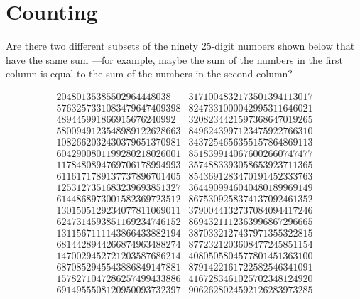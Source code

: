 \chapter{Counting}


\label{why_count_sec}

Are there two different subsets of the ninety 25-digit numbers shown below
that have the same sum ---for example, maybe the sum of the numbers in the
first column is equal to the sum of the numbers in the second column?

{\scriptsize
\[\begin{array}{rr}
  20480135385502964448038 &
3171004832173501394113017 \\
5763257331083479647409398 &
8247331000042995311646021 \\
 489445991866915676240992 &
3208234421597368647019265 \\
5800949123548989122628663 &
8496243997123475922766310 \\
1082662032430379651370981 &
3437254656355157864869113 \\
6042900801199280218026001 &
8518399140676002660747477 \\
1178480894769706178994993 &
3574883393058653923711365 \\
6116171789137737896701405 &
8543691283470191452333763 \\
1253127351683239693851327 &
3644909946040480189969149 \\
6144868973001582369723512 &
8675309258374137092461352 \\
1301505129234077811069011 &
3790044132737084094417246 \\
6247314593851169234746152 &
8694321112363996867296665 \\
1311567111143866433882194 &
3870332127437971355322815 \\
6814428944266874963488274 &
8772321203608477245851154 \\
1470029452721203587686214 &
4080505804577801451363100 \\
6870852945543886849147881 &
8791422161722582546341091 \\
1578271047286257499433886 &
4167283461025702348124920 \\
6914955508120950093732397 &
9062628024592126283973285 \\

\end{array}\]}
